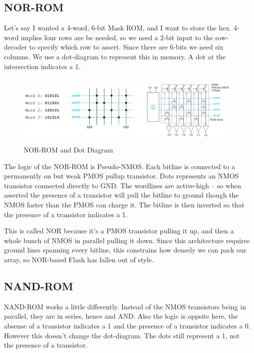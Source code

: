 \documentclass{article}
\begin{document}
\subsection{NOR-ROM}

Let's say I wanted a 4-word, 6-bit Mask ROM, and I want to store the hex. 4-word implies four rows are be needed, so we need a 2-bit input to the row-decoder to specify which row to assert. Since there are 6-bits we need six columns. We use a dot-diagram to represent this in memory. A dot at the intersection indicates a 1.


\begin{figure}[ht!]
\centering
\includegraphics[height=35mm]{NORROM.png}
\caption{NOR-ROM and Dot Diagram}
\end{figure}

The logic of the NOR-ROM is Pseudo-NMOS. Each bitline is connected to a permanently on but weak PMOS pullup transistor. Dots represents an NMOS transistor connected directly to GND.  The wordlines are active-high -- so when asserted the presence of a transistor will pull the bitline to ground though the NMOS faster than the PMOS can charge it. The bitline is then inverted so that the presence of a transistor indicates a 1. 

This is called NOR because it's a PMOS transistor pulling it up, and then a whole bunch of NMOS in parallel pulling it down. Since this architecture requires ground lines spanning every bitline, this constrains how densely we can pack our array, so NOR-based Flash has fallen out of style.

\subsection{NAND-ROM}

NAND-ROM works a little differently. Instead of the NMOS transistors being in parallel, they are in series, hence and AND. Also the logic is oppsite here, the absense of a transistor indicates a 1 and the presence of a transistor indicates a 0. However this doesn't change the dot-diagram. The dots still represent a 1, not the presence of a transistor. 
\end{document}
